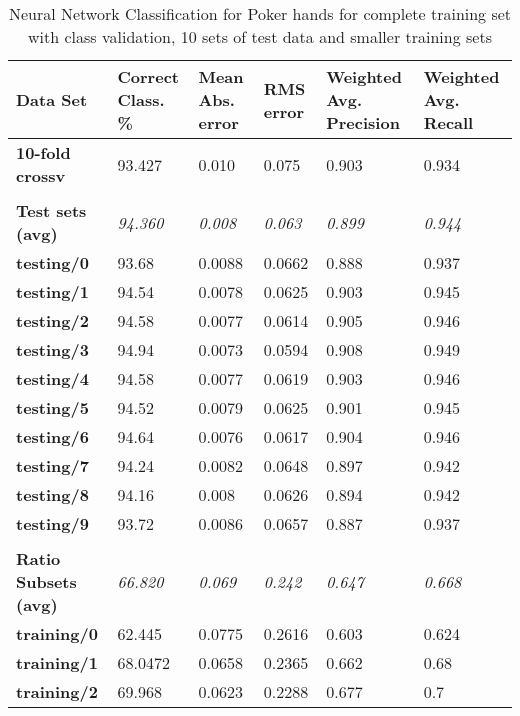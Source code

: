 \documentclass[10pt, a4paper]{article}
\begin{document}
\begin{table}[htbp]
  \centering
  \begin{tabular}{p{3cm}p{1.5cm}p{1.5cm}p{1.5cm}p{1.5cm}p{1.5cm}}
    \toprule
    \textbf{Data Set} & Correct Class. \% & Mean Abs. error & RMS error & Weighted Avg. Precision & Weighted Avg. Recall \\
    \midrule
    \textbf{10-fold crossv} & 93.427 & 0.010 & 0.075 & 0.903 & 0.934 \\
    \textbf{} &       &       &       &       &  \\
    \textbf{Test sets (avg)} & \textit{94.360} & \textit{0.008} & \textit{0.063} & \textit{0.899} & \textit{0.944} \\
    \textbf{   testing/0} & 93.68 & 0.0088 & 0.0662 & 0.888 & 0.937 \\
    \textbf{   testing/1} & 94.54 & 0.0078 & 0.0625 & 0.903 & 0.945 \\
    \textbf{   testing/2} & 94.58 & 0.0077 & 0.0614 & 0.905 & 0.946 \\
    \textbf{   testing/3} & 94.94 & 0.0073 & 0.0594 & 0.908 & 0.949 \\
    \textbf{   testing/4} & 94.58 & 0.0077 & 0.0619 & 0.903 & 0.946 \\
    \textbf{   testing/5} & 94.52 & 0.0079 & 0.0625 & 0.901 & 0.945 \\
    \textbf{   testing/6} & 94.64 & 0.0076 & 0.0617 & 0.904 & 0.946 \\
    \textbf{   testing/7} & 94.24 & 0.0082 & 0.0648 & 0.897 & 0.942 \\
    \textbf{   testing/8} & 94.16 & 0.008 & 0.0626 & 0.894 & 0.942 \\
    \textbf{   testing/9} & 93.72 & 0.0086 & 0.0657 & 0.887 & 0.937 \\
    \textbf{} &       &       &       &       &  \\
    \textbf{Ratio Subsets (avg)} & \textit{66.820} & \textit{0.069} & \textit{0.242} & \textit{0.647} & \textit{0.668} \\
    \textbf{   training/0} & 62.445 & 0.0775 & 0.2616 & 0.603 & 0.624 \\
    \textbf{   training/1} & 68.0472 & 0.0658 & 0.2365 & 0.662 & 0.68 \\
    \textbf{   training/2} & 69.968 & 0.0623 & 0.2288 & 0.677 & 0.7 \\
    \bottomrule
    \end{tabular}%

\caption{Neural Network Classification for Poker hands for complete training set with class validation, 10 sets of test data and smaller training sets}   
  \label{tab:nnresults}%
\end{table}%
\end{document}
